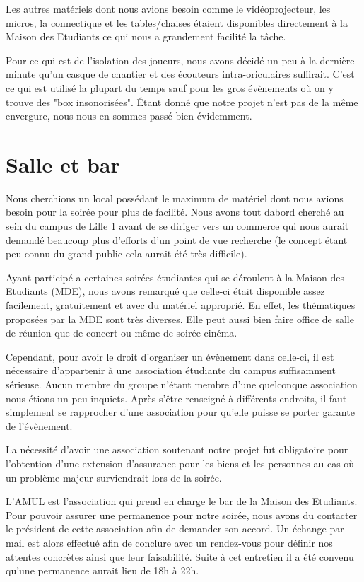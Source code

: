 Les autres matériels dont nous avions besoin comme le vidéoprojecteur,
les micros, la connectique et les tables/chaises étaient disponibles directement à
la Maison des Etudiants ce qui nous a grandement facilité la tâche.

Pour ce qui est de l'isolation des joueurs, nous avons décidé un peu à
la dernière minute qu'un casque de chantier et des écouteurs
intra-oriculaires suffirait. C'est ce qui est utilisé la plupart du
temps sauf pour les gros évènements où on y trouve des "box
insonorisées". Étant donné que notre projet n'est pas de la même
envergure, nous nous en sommes passé bien évidemment.

\section{Salle et bar}%
\label{sec:salle_et_bar}

Nous cherchions un local possédant le maximum de matériel dont nous
avions besoin pour la soirée pour plus de facilité. Nous avons tout
dabord cherché au sein du campus de Lille 1 avant de se diriger vers
un commerce qui nous aurait demandé beaucoup plus d'efforts d'un point de
vue recherche (le concept étant peu connu du grand public cela aurait été
très difficile).

Ayant participé a certaines soirées étudiantes qui se déroulent à la
Maison des Etudiants (MDE), nous avons remarqué que celle-ci était
disponible assez facilement, gratuitement et avec du matériel approprié.
En effet, les thématiques proposées par la MDE sont très diverses. Elle
peut aussi bien faire office de salle de réunion que de concert ou même
de soirée cinéma.

Cependant, pour avoir le droit d'organiser un évènement dans celle-ci, il est nécessaire
d'appartenir à une association étudiante du campus suffisamment sérieuse. Aucun
membre du groupe n'étant membre d'une quelconque association nous étions un
peu inquiets. Après s'être renseigné à différents endroits, il faut
simplement se rapprocher d'une association pour qu'elle puisse se porter
garante de l'évènement.

La nécessité d'avoir une association soutenant notre projet fut obligatoire pour
l'obtention d'une extension d'assurance pour les biens et les personnes
au cas où un problème majeur surviendrait lors de la soirée.

L'AMUL est l'association qui prend en charge le bar de la Maison des
Etudiants. Pour pouvoir assurer une permanence pour notre soirée, nous
avons du contacter le président de cette association afin de demander
son accord. Un échange par mail est alors effectué afin de conclure avec
un rendez-vous pour définir nos attentes concrètes ainsi que leur faisabilité.
Suite à cet entretien il a été convenu qu'une permanence
aurait lieu de 18h à 22h.

